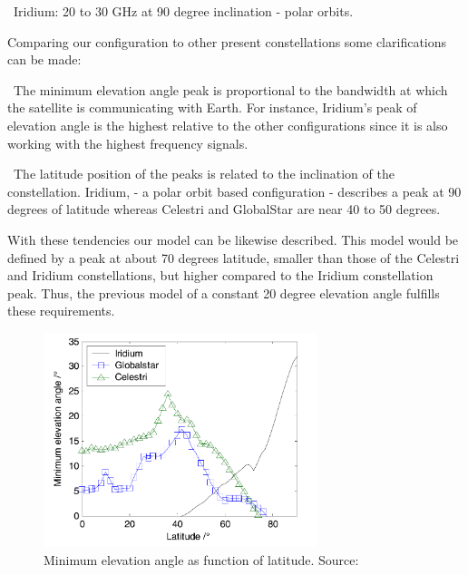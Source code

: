 \textendash\ Iridium: 20 to 30 GHz at 90 degree inclination - polar orbits.

Comparing our configuration to other present constellations some clarifications can be made: 

\textendash\ The minimum elevation angle peak is proportional to the bandwidth at which the satellite is communicating with Earth. For instance, Iridium's peak of elevation angle is the highest relative to the other configurations since it is also working with the highest frequency signals.

\textendash\ The latitude position of the peaks is related to the inclination of the constellation. Iridium, - a polar orbit based configuration - describes a peak at 90 degrees of latitude whereas Celestri and GlobalStar are near 40 to 50 degrees.

With these tendencies our model can be likewise described. This model would be defined by a peak at about 70 degrees latitude, smaller than those of the Celestri and Iridium constellations, but higher compared to the Iridium constellation peak. Thus, the previous model of a constant 20 degree elevation angle fulfills these requirements. 

\begin{figure}[h]
\includegraphics[width=8cm]{latitudes}
\centering
\caption[Minimum elevation angle as function of latitude]{Minimum elevation angle as function of latitude. Source: \cite{Li2016}}
\end{figure}